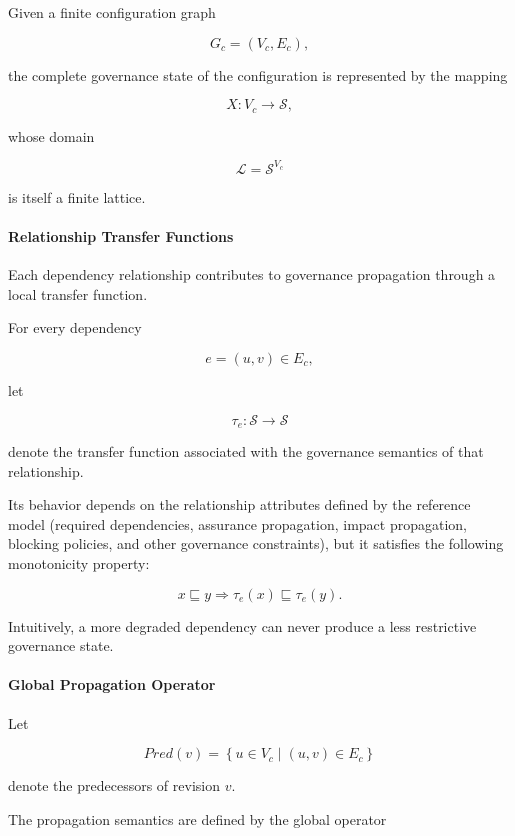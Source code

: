 \documentclass[10pt]{article}
\begin{document}
Given a finite configuration graph

\[
G_c=(V_c,E_c),
\]

the complete governance state of the configuration is represented by the
mapping

\[
X:V_c\rightarrow\mathcal{S},
\]

whose domain

\[
\mathcal{L}
=
\mathcal{S}^{V_c}
\]

is itself a finite lattice.


\paragraph{Relationship Transfer Functions}

Each dependency relationship contributes to governance propagation through a
local transfer function.

For every dependency

\[
e=(u,v)\in E_c,
\]

let

\[
\tau_e:
\mathcal{S}
\rightarrow
\mathcal{S}
\]

denote the transfer function associated with the governance semantics of that
relationship.

Its behavior depends on the relationship attributes defined by the reference
model (required dependencies, assurance propagation, impact propagation,
blocking policies, and other governance constraints), but it satisfies the
following monotonicity property:

\[
x
\sqsubseteq
y
\Longrightarrow
\tau_e(x)
\sqsubseteq
\tau_e(y).
\]

Intuitively, a more degraded dependency can never produce a less restrictive
governance state.


\paragraph{Global Propagation Operator}

Let

\[
Pred(v)
=
\left\{
u\in V_c
\mid
(u,v)\in E_c
\right\}
\]

denote the predecessors of revision $v$.

The propagation semantics are defined by the global operator
\end{document}
